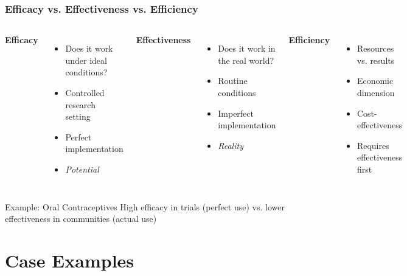 \documentclass{beamer}
\begin{document}
\begin{frame}
\frametitle{Efficacy vs. Effectiveness vs. Efficiency}

\begin{columns}[t] %
\textbf{Efficacy}
\begin{itemize}[itemsep=0.2em] %
    \item Does it work under ideal conditions?
    \item Controlled research setting
    \item Perfect implementation
    \item \textit{Potential}
\end{itemize}

\textbf{Effectiveness}
\begin{itemize}[itemsep=0.2em] %
    \item Does it work in the real world?
    \item Routine conditions
    \item Imperfect implementation
    \item \textit{Reality}
\end{itemize}

\textbf{Efficiency}
\begin{itemize}[itemsep=0.2em] %
    \item Resources vs. results
    \item Economic dimension
    \item Cost-effectiveness
    \item Requires effectiveness first
\end{itemize}
\end{columns}

\vspace{0.3cm}
{
\begin{alertblock}{Example: Oral Contraceptives}
High efficacy in trials (perfect use) vs. lower effectiveness in communities (actual use)
\end{alertblock}}
\end{frame}

\section{Case Examples}
\end{document}
